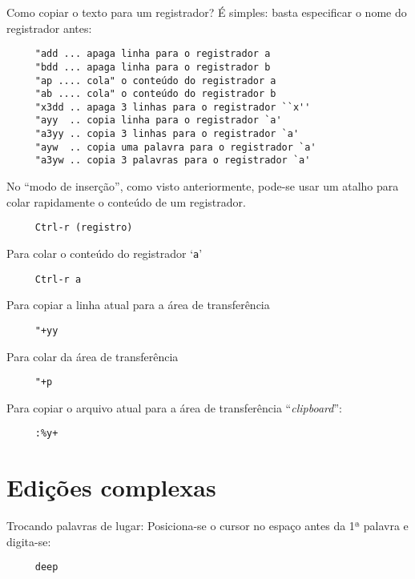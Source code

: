 Como copiar o texto para um registrador? É simples: basta especificar
o nome do registrador antes:

\begin{verbatim}
     "add ... apaga linha para o registrador a
     "bdd ... apaga linha para o registrador b
     "ap .... cola" o conteúdo do registrador a
     "ab .... cola" o conteúdo do registrador b
     "x3dd .. apaga 3 linhas para o registrador ``x''
     "ayy  .. copia linha para o registrador `a'
     "a3yy .. copia 3 linhas para o registrador `a'
     "ayw  .. copia uma palavra para o registrador `a'
     "a3yw .. copia 3 palavras para o registrador `a'
\end{verbatim}

No ``modo de inserção'', como visto anteriormente, pode-se usar um atalho
para colar rapidamente o conteúdo de um registrador.

\begin{verbatim}
     Ctrl-r (registro)
\end{verbatim}

Para colar o conteúdo do registrador `{\tt a}'

\begin{verbatim}
     Ctrl-r a
\end{verbatim}

Para copiar a linha atual para a área de transferência

\begin{verbatim}
     "+yy
\end{verbatim}

Para colar da área de transferência

\begin{verbatim}
     "+p
\end{verbatim}

Para copiar o arquivo atual para a área de transferência ``{\em clipboard}'':

\begin{verbatim}
     :%y+
\end{verbatim}

\section{Edições complexas }
\label{Edições complexas }

Trocando palavras de lugar: Posiciona-se o cursor no espaço antes da 1ª palavra e digita-se:

\begin{verbatim}
     deep
\end{verbatim}

